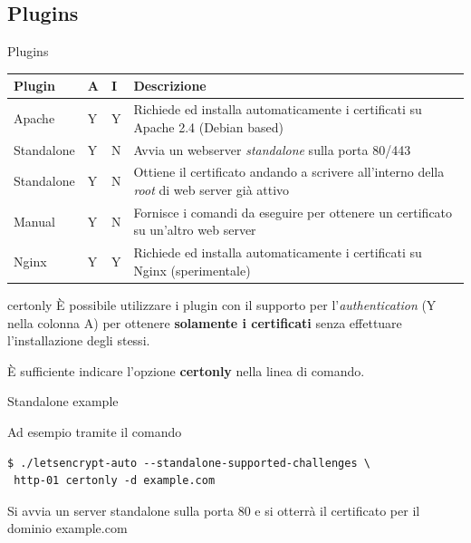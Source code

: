 \documentclass[xcolor=svgnames,11pt]{beamer}
\begin{document}
\subsection{Plugins}
\begin{frame}{Plugins}
\begin{center}
\begin{tabular}{p{2cm}p{0.5cm}p{0.5cm}p{5cm}}
\hline
\textbf{Plugin} & \textbf{A} & \textbf{I} & \textbf{Descrizione}\\
\hline
Apache & Y & Y & {\scriptsize Richiede ed installa automaticamente i certificati su Apache 2.4 (Debian based)} \\
Standalone & Y & N & {\scriptsize Avvia un webserver \emph{standalone} sulla porta 80/443} \\
Standalone & Y & N & {\scriptsize Ottiene il certificato andando a scrivere all'interno della \emph{root} di web server già attivo}\\
Manual & Y & N & {\scriptsize Fornisce i comandi da eseguire per ottenere un certificato su un'altro web server} \\
Nginx & Y & Y & {\scriptsize Richiede ed installa automaticamente i certificati su Nginx (sperimentale)} \\
\hline
\end{tabular}
\end{center}
\end{frame}


\begin{frame}[fragile]{certonly}
È possibile utilizzare i plugin con il supporto per l'\emph{authentication} (Y nella colonna A)
per ottenere \textbf{solamente i certificati} senza effettuare l'installazione degli stessi.

\medskip\pause

È sufficiente indicare l'opzione \textbf{certonly} nella linea di comando.

\medskip

\begin{block}{Standalone example}

Ad esempio tramite il comando
\begin{scriptsize}
\begin{verbatim}
$ ./letsencrypt-auto --standalone-supported-challenges \
 http-01 certonly -d example.com
\end{verbatim}
\end{scriptsize}

Si avvia un server standalone sulla porta 80 e si otterrà il certificato per il dominio example.com
\end{block}
\end{frame}
\end{document}
